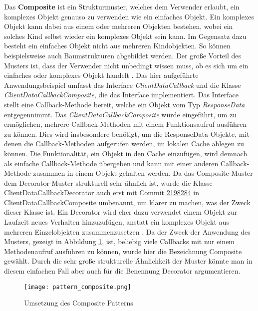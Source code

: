 Das \textbf{Composite} ist ein Strukturmuster, welches dem Verwender erlaubt, ein komplexes Objekt genauso zu verwenden wie ein einfaches Objekt.
Ein komplexes Objekt kann dabei aus einem oder mehreren Objekten bestehen, wobei ein solches Kind selbst wieder ein komplexes Objekt sein kann.
Im Gegensatz dazu besteht ein einfaches Objekt nicht aus mehreren Kindobjekten.
So können beispielsweise auch Baumstrukturen abgebildet werden.
Der große Vorteil des Musters ist, dass der Verwender nicht unbedingt wissen muss, ob es sich um ein einfaches oder komplexes Objekt handelt
\cite[pp.~142--155]{geirhos2015entwurfsmuster}.
\newline
Das hier aufgeführte Anwendungsbeispiel umfasst das Interface \textit{ClientDataCallback} und die Klasse \textit{ClientDataCallbackComposite}, die das Interface implementiert.
Das Interface stellt eine Callback-Methode bereit, welche ein Objekt vom Typ \textit{ResponseData} entgegennimmt.
Das \textit{ClientDataCallbackComposite} wurde eingeführt, um zu ermöglichen, mehrere Callback-Methoden mit einem Funktionsaufruf ausführen zu können.
Dies wird insbesondere benötigt, um die ResponseData-Objekte, mit denen die Callback-Methoden aufgerufen werden, im lokalen Cache ablegen zu können.
Die Funktionalität, ein Objekt in den Cache einzufügen, wird demnach als einfache Callback-Methode übergeben und kann mit einer anderen Callback-Methode zusammen in einem Objekt gehalten werden.
\newline
Da das Composite-Muster dem Decorator-Muster strukturell sehr ähnlich ist, wurde die Klasse ClientDataCallbackDecorator auch erst mit Commit \href{https://github.com/lukaspanni/OpenSourceStats/commit/2198284a8f90a76a0e0a2e99f9be87855595458e}{2198284} in ClientDataCallbackComposite umbenannt, um klarer zu machen, was der Zweck dieser Klasse ist.
Ein Decorator wird eher dazu verwendet einem Objekt zur Laufzeit neues Verhalten hinzuzufügen, anstatt ein komplexes Objekt aus mehreren Einzelobjekten zusammenzusetzen \cite[pp.~155-169]{geirhos2015entwurfsmuster}.
Da der Zweck der Anwendung des Musters, gezeigt in Abbildung \ref{fig:pattern_composite}, ist, beliebig viele Callbacks mit nur einem Methodenaufruf ausführen zu können, wurde hier die Bezeichnung Composite gewählt.
Durch die sehr große strukturelle Ähnlichkeit der Muster könnte man in diesem einfachen Fall aber auch für die Benennung Decorator argumentieren.

\begin{figure}[h]
    \texttt{[image: pattern\_composite.png]}
    \centering
    \caption{Umsetzung des Composite Patterns}
    \label{fig:pattern_composite}
\end{figure}

